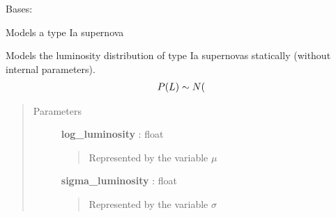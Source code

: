 \documentclass[letterpaper,10pt,english]{sphinxmanual}
\begin{document}

\begin{fulllineitems}
\label{dessn.model.nodes:dessn.model.nodes.supernova.SupernovaIa}
Bases: 

Models a type Ia supernova

Models the luminosity distribution of type Ia supernovas statically (without
internal parameters).
\begin{gather}
\begin{split}P(L) \sim N(\end{split}\notag
\end{gather}\begin{quote}\begin{description}
\item[{Parameters}] \leavevmode
\textbf{log\_luminosity} : float
\begin{quote}

Represented by the variable \(\mu\)
\end{quote}

\textbf{sigma\_luminosity} : float
\begin{quote}

Represented by the variable \(\sigma\)
\end{quote}

\end{description}\end{quote}

\begin{fulllineitems}
\label{dessn.model.nodes:dessn.model.nodes.supernova.SupernovaIa.get_luminosity_prob}
\end{fulllineitems}


\begin{fulllineitems}
\label{dessn.model.nodes:dessn.model.nodes.supernova.SupernovaIa.type}
\end{fulllineitems}


\end{fulllineitems}
\end{document}
